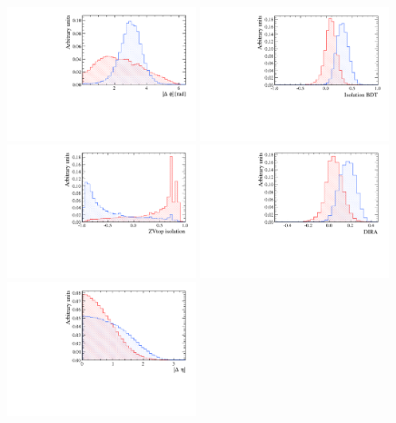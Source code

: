 \begin{figure}[htbp]
  \centering
    \includegraphics[width=0.49\textwidth]{./Figs/Appendix2/phi.pdf}
    \includegraphics[width=0.49\textwidth]{./Figs/Appendix2/isoBDT.pdf}
    \includegraphics[width=0.49\textwidth]{./Figs/Appendix2/ZViso.pdf}
    \includegraphics[width=0.49\textwidth]{./Figs/Appendix2/DIRA.pdf}
    \includegraphics[width=0.49\textwidth]{./Figs/Appendix2/eta.pdf}

\end{figure}
